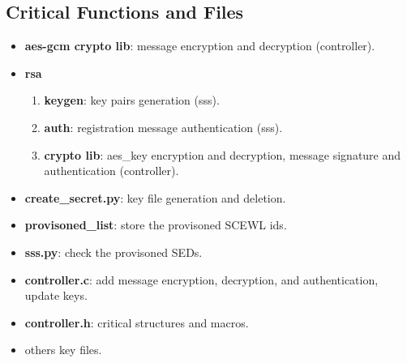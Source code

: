 \documentclass[11pt,oneside,onecolumn,letterpaper]{article}
\begin{document}
\subsection{Critical Functions and Files}
\begin{itemize}
  \item \textbf{aes-gcm crypto lib}: message encryption and decryption (controller).
  \item \textbf{rsa}
  \begin{enumerate}
    \item \textbf{keygen}: key pairs generation (sss).
    \item \textbf{auth}: registration message authentication (sss).
    \item \textbf{crypto lib}: aes\_key encryption and decryption, message signature and authentication (controller).
  \end{enumerate}
  \item \textbf{create\_secret.py}: key file generation and deletion.
  \item \textbf{provisoned\_list}: store the provisoned SCEWL ids.
  \item \textbf{sss.py}: check the provisoned SEDs.
  \item \textbf{controller.c}: add message encryption, decryption, and authentication, update keys.
  \item \textbf{controller.h}: critical structures and macros.
  \item others key files.
\end{itemize}



\end{document}
